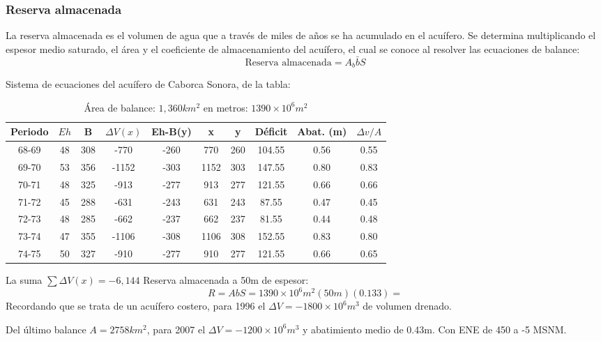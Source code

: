 \subsubsection{Reserva almacenada}
La reserva almacenada es el volumen de agua que a través de miles de años se ha acumulado en el acuífero. Se determina multiplicando el espesor medio saturado, el área y el coeficiente de almacenamiento del acuífero, el cual se conoce al resolver las ecuaciones de balance:
\begin{equation}
    \text{Reserva almacenada}= A_b \bar{b}S
\end{equation}
\begin{example}
    Sistema de ecuaciones del acuífero de Caborca Sonora, de la tabla:
    \begin{table}[h!]
        \centering
        \begin{tabular}{@{}cccccccccc@{}}
        \toprule
        Periodo & $Eh$ & B   & $\Delta V(x)$ & Eh-B(y) & x    & y   & Déficit & Abat. (m) & $\Delta v/A$ \\ \midrule
        68-69   & 48   & 308 & -770          & -260    & 770  & 260 & 104.55  & 0.56      & 0.55         \\
        69-70   & 53   & 356 & -1152         & -303    & 1152 & 303 & 147.55  & 0.80      & 0.83         \\
        70-71   & 48   & 325 & -913          & -277    & 913  & 277 & 121.55  & 0.66      & 0.66         \\
        71-72   & 45   & 288 & -631          & -243    & 631  & 243 & 87.55   & 0.47      & 0.45         \\
        72-73   & 48   & 285 & -662          & -237    & 662  & 237 & 81.55   & 0.44      & 0.48         \\
        73-74   & 47   & 355 & -1106         & -308    & 1106 & 308 & 152.55  & 0.83      & 0.80         \\
        74-75   & 50   & 327 & -910          & -277    & 910  & 277 & 121.55  & 0.66      & 0.65         \\ \bottomrule
        \end{tabular}
        \caption{Área de balance: $1,360 km^2$ en metros: $1390\times 10^{6}m^2$}
        \label{tabgh16}
    \end{table}
    La suma $\sum \Delta V(x)=-6,144$
    Reserva almacenada a 50m de espesor:
\begin{equation*}
    R = AbS = 1390 \times 10^6 m^2(50m)(0.133) = 
\end{equation*}
Recordando que se trata de un acuífero costero, para 1996 el $\Delta V= -1800\times 10^6m^3$ de volumen drenado.

Del último balance $A=2758km^2$, para 2007 el $\Delta V=-1200\times 10^6m^3$ y abatimiento medio de 0.43m. Con ENE de 450 a -5 MSNM.
\end{example}